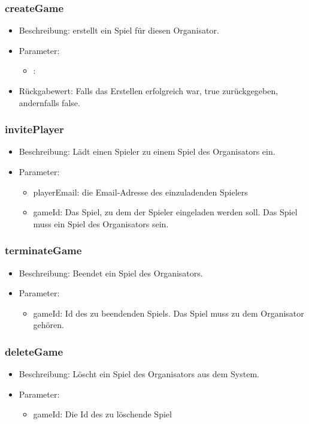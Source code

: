 \documentclass[a4paper]{scrreprt}
\begin{document}
    \subsubsection{createGame}
    \begin{itemize}
        \item Beschreibung: erstellt ein Spiel für diesen Organisator.
        \item Parameter: %
        \begin{itemize}
            \item :
        \end{itemize}
        \item Rückgabewert: Falls das Erstellen erfolgreich war, true zurückgegeben, andernfalls false. 
    \end{itemize}
    \subsubsection{invitePlayer}
    \begin{itemize}
        \item Beschreibung: Lädt einen Spieler zu einem Spiel des Organisators ein.
        \item Parameter:
        \begin{itemize}
            \item playerEmail: die Email-Adresse des einzuladenden Spielers
            \item gameId: Das Spiel, zu dem der Spieler eingeladen werden soll. Das Spiel muss ein Spiel des Organisators sein.
        \end{itemize}
    \end{itemize}
    \subsubsection{terminateGame}
    \begin{itemize}
        \item Beschreibung: Beendet ein Spiel des Organisators. 
        \item Parameter:
        \begin{itemize}
            \item gameId: Id des zu beendenden Spiels. Das Spiel muss zu dem Organisator gehören.
        \end{itemize}
    \end{itemize}
    \subsubsection{deleteGame}
    \begin{itemize}
        \item Beschreibung: Löscht ein Spiel des Organisators aus dem System. 
        \item Parameter:
        \begin{itemize}
            \item gameId: Die Id des zu löschende Spiel
        \end{itemize}
    \end{itemize}
\end{document}

